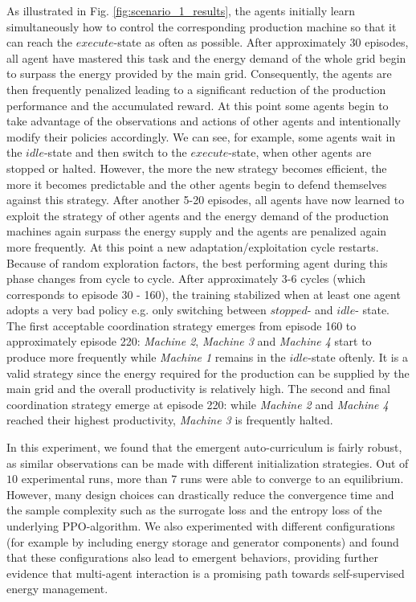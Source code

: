 As illustrated in Fig. \ref{fig:scenario_1_results}, the agents initially learn simultaneously how to control the corresponding production machine so that it can reach the $execute$-state as often as possible. After approximately 30 episodes, all agent have mastered this task and the energy demand of the whole grid begin to surpass the energy provided by the main grid. Consequently, the agents are then frequently penalized leading to a significant reduction of the production performance and the accumulated reward. At this point some agents begin to take advantage of the observations and actions of other agents and intentionally modify their policies accordingly. We can see, for example, some agents wait in the $idle$-state and then switch to the $execute$-state, when other agents are stopped or halted. However, the more the new strategy becomes efficient, the more it becomes predictable and the other agents begin to defend themselves against this strategy. After another 5-20 episodes, all agents have now learned to exploit the strategy of other agents and the energy demand of the production machines again surpass the energy supply and the agents are penalized again more frequently. At this point a new adaptation/exploitation cycle restarts. Because of random exploration factors, the best performing agent during this phase changes from cycle to cycle. After approximately 3-6 cycles (which corresponds to episode 30 - 160), the training stabilized when at least one agent adopts a very bad policy e.g. only switching between $stopped$- and $idle$- state. The first acceptable coordination strategy emerges from episode 160 to approximately episode 220: \textit{Machine 2}, \textit{Machine 3} and \textit{Machine 4} start to produce more frequently while \textit{Machine 1} remains in the $idle$-state oftenly. It is a valid strategy since the energy required for the production can be supplied by the main grid and the overall productivity is  relatively high. The second and final coordination strategy emerge at episode 220: while \textit{Machine 2} and \textit{Machine 4} reached their highest productivity,  \textit{Machine 3} is frequently halted.

In this experiment, we found that the emergent auto-curriculum is fairly robust, as similar observations can be made with different initialization strategies. Out of $10$ experimental runs, more than $7$ runs were able to converge to an equilibrium. However, many design choices can drastically reduce the convergence time and the sample complexity such as the surrogate loss and the entropy loss of the underlying PPO-algorithm. We also experimented with different configurations (for example by including energy storage and generator components) and found that these configurations also lead to emergent behaviors, providing further evidence that multi-agent interaction is a promising path towards self-supervised energy management.

